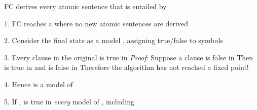 \documentclass{article}
\begin{document}
\begin{huge}

\maxfigwidth
{}


\maxfigwidth
{}


\maxfigwidth
{}


\maxfigwidth
{}


\maxfigwidth
{}


\maxfigwidth
{}


FC derives every atomic sentence that is entailed by 

1. FC reaches a  where no new atomic sentences are derived

2. Consider the final state as a model , assigning true/false to symbols

3. Every clause in the original  is true in \al
   \emph{Proof}:  Suppose a clause  is false in \al
   Then  is true in  and  is false in \al
   Therefore the algorithm has not reached a fixed point!

4. Hence  is a model of 

5. If ,  is true in \emph{every} model of , including 


\end{huge}
\end{document}
